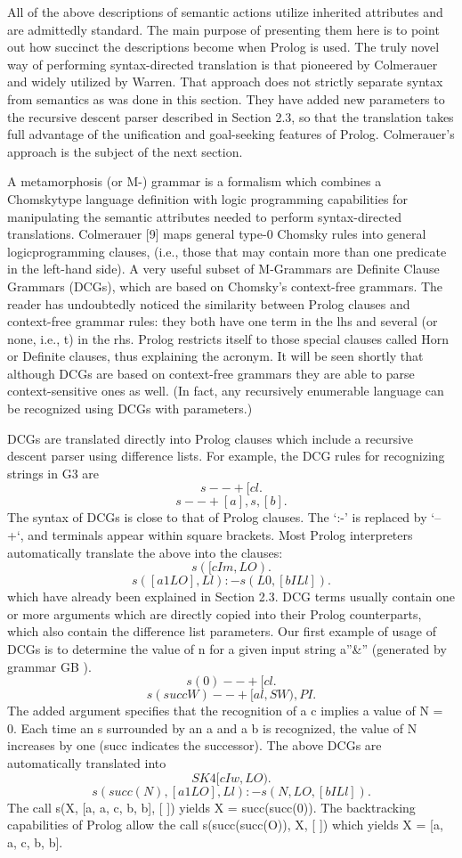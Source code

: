 All of the above descriptions of semantic actions utilize inherited attributes
and are admittedly standard. The main purpose of presenting them here is to
point out how succinct the descriptions become when Prolog is used. The truly
novel way of performing syntax-directed translation is that pioneered by
Colmerauer and widely utilized by Warren. That approach does not strictly
separate syntax from semantics as was done in this section. They have added
new parameters to the recursive descent parser described in Section 2.3, so that
the translation takes full advantage of the unification and goal-seeking features
of Prolog. Colmerauer’s approach is the subject of the next section. 

\label{cohen3}

A metamorphosis (or M-) grammar is a formalism which combines a Chomskytype
language definition with logic programming capabilities for manipulating
the semantic attributes needed to perform syntax-directed translations.
Colmerauer [9] maps general type-0 Chomsky rules into general logicprogramming
clauses, (i.e., those that may contain more than one predicate in
the left-hand side). A very useful subset of M-Grammars are Definite Clause
Grammars (DCGs), which are based on Chomsky’s context-free grammars. The
reader has undoubtedly noticed the similarity between Prolog clauses and context-free
grammar rules: they both have one term in the lhs and several (or none,
i.e., t) in the rhs. Prolog restricts itself to those special clauses called Horn or
Definite clauses, thus explaining the acronym. It will be seen shortly that
although DCGs are based on context-free grammars they are able to parse
context-sensitive ones as well. (In fact, any recursively enumerable language can
be recognized using DCGs with parameters.) 

DCGs are translated directly into Prolog clauses which include a recursive
descent parser using difference lists. For example, the DCG rules for recognizing
strings in G3 are
\[s --+ [cl.\]
\[s --+ [a], s, [b].\]
The syntax of DCGs is close to that of Prolog clauses. The ‘:-’ is replaced
by ‘--+‘, and terminals appear within square brackets. Most Prolog interpreters
automatically translate the above into the clauses:
\[s([c I m, LO).\]
\[s([a 1 LO], Ll) :- s(L0, [b I Ll]).\]
which have already been explained in Section 2.3. DCG terms usually contain
one or more arguments which are directly copied into their Prolog counterparts,
which also contain the difference list parameters. Our first example of usage of
DCGs is to determine the value of n for a given input string a”\&” (generated by
grammar GB ).
\[s(0) --+ [cl.\]
\[s(succW) --+ [al, SW), PI.\]
The added argument specifies that the recognition of a c implies a value of
N = 0. Each time an s surrounded by an a and a b is recognized, the value of N
increases by one (succ indicates the successor). The above DCGs are automatically
translated into
\[SK4 [c I w, LO).\]
\[s(succ(N), [a 1 LO], Ll) :- s(N, LO, [b I Ll]).\]
The call s(X, [a, a, c, b, b], [ ]) yields X = succ(succ(0)). The backtracking
capabilities of Prolog allow the call s(succ(succ(O)), X, [ ]) which yields X =
[a, a, c, b, b]. 

